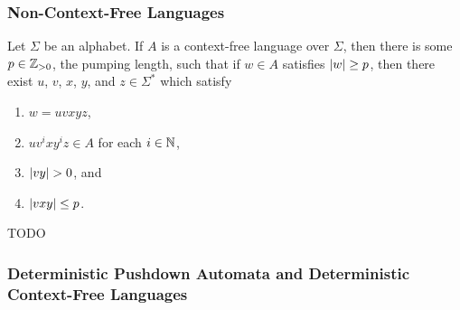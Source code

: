 \subsubsection{Non-Context-Free Languages}

  Let \(\Sigma\) be an alphabet. If \(A\) is a context-free language over \(\Sigma\), then there is some
  \(p \in \mathbb{Z}_{>0}\), the pumping length, such that if \(w \in A\) satisfies \(\lvert w\rvert \geq p\), then there exist \(u\),
  \(v\), \(x\), \(y\), and \(z \in \Sigma^*\) which satisfy
  \begin{enumerate}
    \item \(w = u v x y z\),
    \item \(u v^i x y^i z \in A\) for each \(i \in \mathbb{N}\),
    \item \(\lvert v y\rvert > 0\), and
    \item \(\lvert v x y\rvert \leq p\).
  \end{enumerate}
\Eth
\Bpr
  TODO
\Epr

\subsubsection{Deterministic Pushdown Automata and Deterministic Context-Free
Languages}

\Edc

